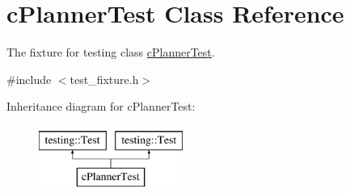 \hypertarget{classc_planner_test}{}\section{c\+Planner\+Test Class Reference}
\label{classc_planner_test}


The fixture for testing class \mbox{\hyperlink{classc_planner_test}{c\+Planner\+Test}}.  




{\ttfamily \#include $<$test\+\_\+fixture.\+h$>$}

Inheritance diagram for c\+Planner\+Test\+:\begin{figure}[H]
\begin{center}
\leavevmode
\includegraphics[height=2.000000cm]{classc_planner_test}
\end{center}
\end{figure}
